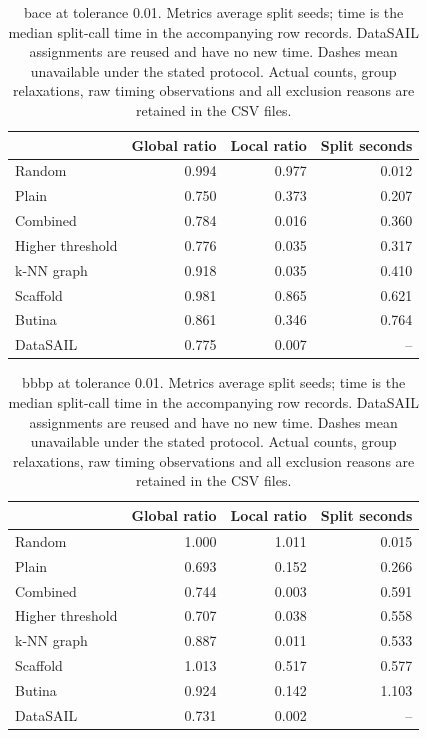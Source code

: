 \begin{table}[htbp]\centering\small
\begin{tabular}{lrrr}
\toprule
 & Global ratio & Local ratio & Split seconds \\
\midrule
Random & 0.994 & 0.977 & 0.012 \\
Plain & 0.750 & 0.373 & 0.207 \\
Combined & 0.784 & 0.016 & 0.360 \\
Higher threshold & 0.776 & 0.035 & 0.317 \\
k-NN graph & 0.918 & 0.035 & 0.410 \\
Scaffold & 0.981 & 0.865 & 0.621 \\
Butina & 0.861 & 0.346 & 0.764 \\
DataSAIL & 0.775 & 0.007 & -- \\
\bottomrule
\end{tabular}

\caption{bace at tolerance 0.01. Metrics average split seeds; time is the median split-call time in the accompanying row records. DataSAIL assignments are reused and have no new time. Dashes mean unavailable under the stated protocol. Actual counts, group relaxations, raw timing observations and all exclusion reasons are retained in the CSV files.}\end{table}
\begin{table}[htbp]\centering\small
\begin{tabular}{lrrr}
\toprule
 & Global ratio & Local ratio & Split seconds \\
\midrule
Random & 1.000 & 1.011 & 0.015 \\
Plain & 0.693 & 0.152 & 0.266 \\
Combined & 0.744 & 0.003 & 0.591 \\
Higher threshold & 0.707 & 0.038 & 0.558 \\
k-NN graph & 0.887 & 0.011 & 0.533 \\
Scaffold & 1.013 & 0.517 & 0.577 \\
Butina & 0.924 & 0.142 & 1.103 \\
DataSAIL & 0.731 & 0.002 & -- \\
\bottomrule
\end{tabular}

\caption{bbbp at tolerance 0.01. Metrics average split seeds; time is the median split-call time in the accompanying row records. DataSAIL assignments are reused and have no new time. Dashes mean unavailable under the stated protocol. Actual counts, group relaxations, raw timing observations and all exclusion reasons are retained in the CSV files.}\end{table}
